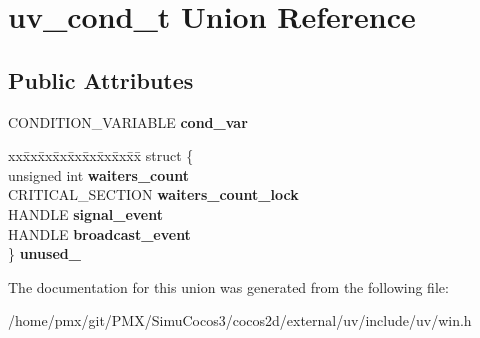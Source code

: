 \hypertarget{unionuv__cond__t}{}\section{uv\+\_\+cond\+\_\+t Union Reference}
\label{unionuv__cond__t}
\subsection*{Public Attributes}
\begin{DoxyCompactItemize}
\item 
\mbox{\label{unionuv__cond__t_a0cf7184c500bb02ae4465ab0ac0c405e}} 
C\+O\+N\+D\+I\+T\+I\+O\+N\+\_\+\+V\+A\+R\+I\+A\+B\+LE {\bfseries cond\+\_\+var}
\item 
\mbox{\label{unionuv__cond__t_a385a32fabd3c1fa121a6a791fab18f24}} 
\begin{tabbing}
xx\=xx\=xx\=xx\=xx\=xx\=xx\=xx\=xx\=\kill
struct \{\\
\>unsigned int {\bfseries waiters\_count}\\
\>CRITICAL\_SECTION {\bfseries waiters\_count\_lock}\\
\>HANDLE {\bfseries signal\_event}\\
\>HANDLE {\bfseries broadcast\_event}\\
\} {\bfseries unused\_}\\

\end{tabbing}\end{DoxyCompactItemize}


The documentation for this union was generated from the following file\+:\begin{DoxyCompactItemize}
\item 
/home/pmx/git/\+P\+M\+X/\+Simu\+Cocos3/cocos2d/external/uv/include/uv/win.\+h\end{DoxyCompactItemize}
